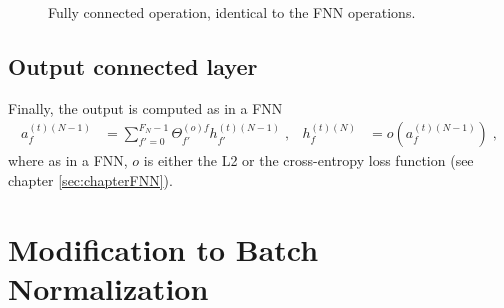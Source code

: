 \begin{figure}[H]
\begin{center}
\caption{Fully connected operation, identical to the FNN operations.}
\end{center}
\end{figure}

\subsection{Output connected layer}

Finally, the output is computed as in a FNN
\begin{align}
a_{f}^{(t)(N-1)}&=\sum^{F_{N}-1}_{f'=0}\Theta^{(o)f}_{f'}h^{(t)(N-1)}_{f'}\;,
&
h_{f}^{(t)(N)}&=o\left(a_{f}^{(t)(N-1)}\right)\;,
\end{align}
where as in a FNN, $o$ is either the L2 or the cross-entropy loss function (see chapter \ref{sec:chapterFNN}).

\section{Modification to Batch Normalization}


